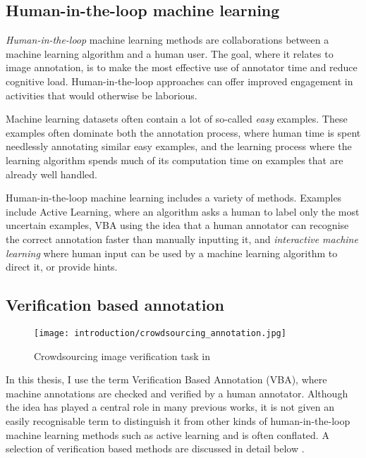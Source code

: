 \subsection{Human-in-the-loop machine learning}

\emph{Human-in-the-loop} machine learning methods are collaborations between a machine learning algorithm and a human user. The goal, where it relates to image annotation, is to make the most effective use of annotator time and reduce cognitive load. Human-in-the-loop approaches can offer improved engagement in activities that would otherwise be laborious.

Machine learning datasets often contain a lot of so-called \emph{easy} examples. These examples often dominate both the annotation process, where human time is spent needlessly annotating similar easy examples, and the learning process where the learning algorithm spends much of its computation time on examples that are already well handled. 

Human-in-the-loop machine learning includes a variety of methods. Examples include Active Learning, where an algorithm asks a human to label only the most uncertain examples, \gls{VBA} using the idea that a human annotator can recognise the correct annotation faster than manually inputting it, and \emph{interactive machine learning} where human input can be used by a machine learning algorithm to direct it, or provide hints. 

\subsection{Verification based annotation}

\begin{figure}[ht]
  \centering
  \texttt{[image: introduction/crowdsourcing\_annotation.jpg]}
  \caption{Crowdsourcing image verification task in \cite{Su2012a}} 
  \label{fig:crowdsourcing}
\end{figure}

In this thesis, I use the term Verification Based Annotation (VBA), where machine annotations are checked and verified by a human annotator. Although the idea has played a central role in many previous works, it is not given an easily recognisable term to distinguish it from other kinds of human-in-the-loop machine learning methods such as active learning and is often conflated. A selection of verification based methods are discussed in detail below \cite{Yao2012, McNeill2011, Adhikaria2018, Castrejon2017, Papadopoulos2016, Russakovsky2015a}. 

